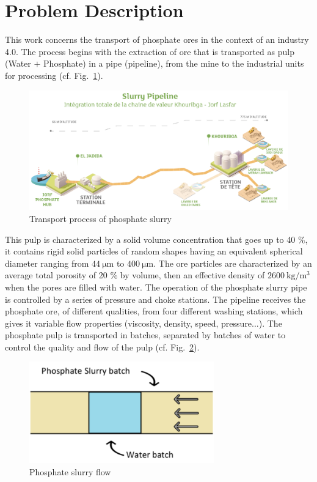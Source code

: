 \documentclass[11pt]{report}
\begin{document}
\section{Problem Description}
This work concerns the transport of phosphate ores in the context of an industry 4.0. The process begins with the extraction of ore that is transported as pulp (Water $+$ Phosphate) in a pipe (pipeline), from the mine to the industrial units for processing (cf. Fig.~\ref{fig:process-phosphate}). 
\begin{figure}[ht!]
\begin{center}
%
\includegraphics[width=12cm]{figs/pipe.png}
\caption{Transport process of phosphate slurry }
\label{fig:process-phosphate}
\end{center}
\end{figure} 
%
This pulp is characterized by a solid volume concentration that goes up  to 40 $\%$, it contains rigid solid particles of random shapes having an equivalent spherical diameter ranging from $44~\mathrm{\mu m}$ to $400~\mathrm{\mu m}$.
%
The ore particles are characterized by an average total porosity of 20 $\%$ by volume, then an effective density of $2600~\mathrm{kg/m^3}$ when the pores are filled with water.
%
The operation of the phosphate slurry pipe is controlled by a series of pressure and choke stations.
%
The pipeline receives the phosphate ore, of different qualities, from four different washing stations, which gives it variable flow properties (viscosity, density, speed, pressure...).
%
The phosphate pulp is transported in batches, separated by batches of water to control the quality and flow of the pulp (cf. Fig.~\ref{fig:phosphate-flow}). 
%
\begin{figure}[ht!]
\begin{center}
%
\includegraphics[width=8cm]{figs/batch.png}
\caption{Phosphate slurry flow}
\label{fig:phosphate-flow}
\end{center}
\end{figure} 
\end{document}
